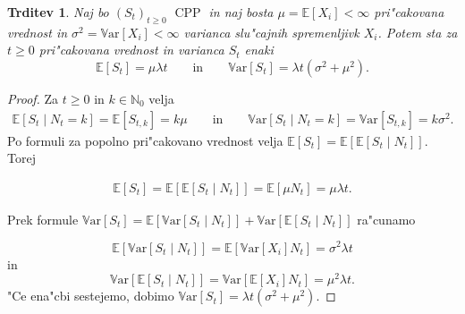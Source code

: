 \documentclass[12pt, a4paper, reqno]{amsart}
\theoremstyle{definition}
\theoremstyle{plain}
\newtheorem{trditev}[definicija]{Trditev}
\newcommand{\N}{\mathbb{N}}
\newcommand{\E}{\mathbb{E}}
\newcommand{\1}{\mathds{1}}
\newcommand{\Var}[1]{\text{$\mathbb{V}\!\mathrm{ar}$}\left[#1\right]}
\DeclareMathOperator{\CPP}{CPP}
\begin{document}
        \begin{trditev}
            Naj bo $(S_t)_{t\geq 0}$ $\CPP$ in naj bosta $\mu = \E\left[X_i\right] < \infty$ 
            pri"cakovana vrednost in $\sigma^2= \Var{X_i} <\infty$ varianca
            slu"cajnih spremenljivk $X_i$. Potem sta za $t\geq0$ pri"cakovana vrednost in 
            varianca $S_t$ enaki 
            \begin{equation*}
                \E\left[S_t\right] = \mu\lambda t \qquad \text{in} \qquad \Var{S_t} = \lambda t\left(\sigma^2 + \mu^2\right).
            \end{equation*}
            \label{trd:PricVarCPP}
        \end{trditev}

        \begin{proof}

            Za $t\geq0$ in $k\in \N_0$ velja 
            \begin{align*}
            \E\left[S_t\mid N_t = k\right] = \E\left[S_{t, k}\right] = k\mu \qquad \text{in} \qquad
            \Var{S_t\mid N_t = k} = \Var{S_{t, k}} = k\sigma^2.
            \end{align*} 
            Po formuli za popolno pri"cakovano vrednost velja 
            $\E\left[S_t\right] = \E\left[\E\left[S_t\mid N_t\right]\right]$. Torej

            \begin{align*}
                \E\left[S_t\right] = \E\left[\E\left[S_t\mid N_t\right]\right] = \E\left[\mu N_t\right] = \mu\lambda t.
            \end{align*}

            \noindent
            Prek formule $\Var{S_t} = \E\left[\Var{S_t\mid N_t}\right] + \Var{\E\left[S_t\mid N_t\right]}$ ra"cunamo 

            \begin{equation*}
                \E\left[\Var{S_t\mid N_t}\right] = \E\left[\Var{X_i}N_t\right] = \sigma^2\lambda t
            \end{equation*}
            in 
            \begin{equation*}
                \Var{\E\left[S_t\mid N_t\right]} = \Var{\E\left[X_i\right]N_t} = \mu^2\lambda t.
            \end{equation*}
            "Ce ena"cbi sestejemo, dobimo $\Var{S_t} = \lambda t\left(\sigma^2 + \mu^2\right)$.
        \end{proof}
    
\end{document}
